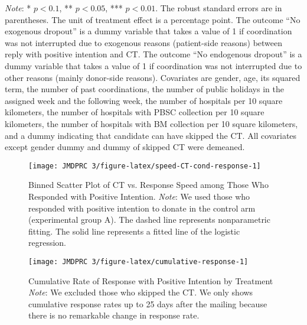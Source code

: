 \documentclass[12pt, a4paper]{article}
\begin{document}
\begin{table}[H]
\begin{threeparttable}
\begin{tablenotes}
\item \emph{Note}: * $p < 0.1$, ** $p < 0.05$, *** $p < 0.01$. The robust standard errors are in parentheses. The unit of treatment effect is a percentage point. The outcome ``No exogenous dropout'' is a dummy variable that takes a value of 1 if coordination was not interrupted due to exogenous reasons (patient-side reasons) between reply with positive intention and CT. The outcome ``No endogenous dropout'' is a dummy variable that takes a value of 1 if coordination was not interrupted due to other reasons (mainly donor-side reasons). Covariates are gender, age, its squared term, the number of past coordinations, the number of public holidays in the assigned week and the following week, the number of hospitals per 10 square kilometers, the number of hospitals with PBSC collection per 10 square kilometers, the number of hospitals with BM collection per 10 square kilometers, and a dummy indicating that candidate can have skipped the CT. All covariates except gender dummy and dummy of skipped CT were demeaned.
\end{tablenotes}
\end{threeparttable}
\end{table}

\begin{figure}[H]
\texttt{[image: JMDPRC~3/figure-latex/speed-CT-cond-response-1]} \caption{Binned Scatter Plot of CT vs. Response Speed among Those Who Responded with Positive Intention. \newline \emph{Note}: We used those who responded with positive intention to donate in the control arm (experimental group A). The dashed line represents nonparametric fitting. The solid line represents a fitted line of the logistic regression.}\label{fig:speed-CT-cond-response}
\end{figure}

\begin{figure}[t]
\texttt{[image: JMDPRC~3/figure-latex/cumulative-response-1]} \caption{Cumulative Rate of Response with Positive Intention by Treatment \newline \emph{Note}: We excluded those who skipped the CT. We only shows cumulative response rates up to 25 days after the mailing because there is no remarkable change in response rate.}\label{fig:cumulative-response}
\end{figure}

\clearpage
\end{document}
